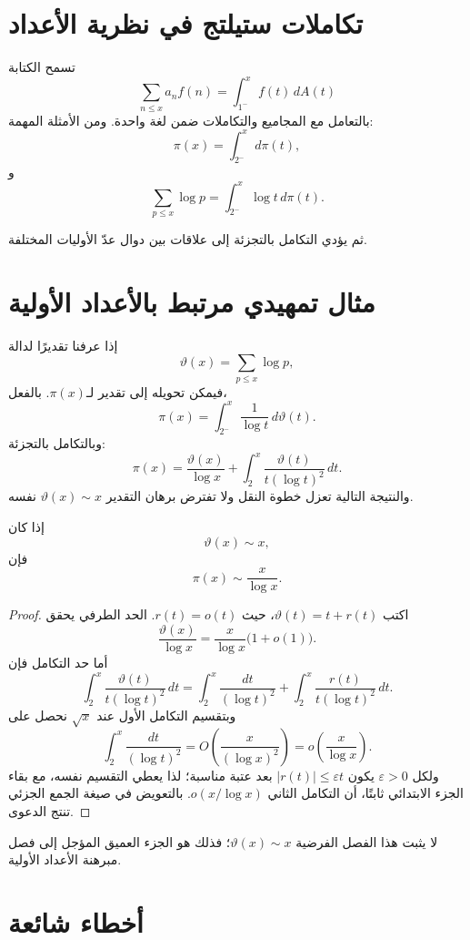 \section{تكاملات ستيلتج في نظرية الأعداد}

تسمح الكتابة
\[
\sum_{n\leq x}a_nf(n)
=
\int_{1^-}^{x}f(t)\,dA(t)
\]
بالتعامل مع المجاميع والتكاملات ضمن لغة واحدة. ومن الأمثلة المهمة:
\[
\pi(x)=\int_{2^-}^{x}d\pi(t),
\]
و
\[
\sum_{p\leq x}\log p
=
\int_{2^-}^{x}\log t\,d\pi(t).
\]

ثم يؤدي التكامل بالتجزئة إلى علاقات بين دوال عدّ الأوليات المختلفة.

\section{مثال تمهيدي مرتبط بالأعداد الأولية}

إذا عرفنا تقديرًا لدالة
\[
\vartheta(x)=\sum_{p\leq x}\log p,
\]
فيمكن تحويله إلى تقدير لـ\(\pi(x)\). بالفعل،
\[
\pi(x)
=
\int_{2^-}^{x}\frac{1}{\log t}\,d\vartheta(t).
\]
وبالتكامل بالتجزئة:
\[
\pi(x)
=
\frac{\vartheta(x)}{\log x}
+
\int_2^x\frac{\vartheta(t)}{t(\log t)^2}\,dt.
\]
والنتيجة التالية تعزل خطوة النقل ولا تفترض برهان التقدير
\(\vartheta(x)\sim x\) نفسه.

\begin{theorem}
\label{thm:theta-implies-pnt}
\provedhere
إذا كان
\[
\vartheta(x)\sim x,
\]
فإن
\[
\pi(x)\sim\frac{x}{\log x}.
\]
\end{theorem}

\begin{proof}
اكتب \(\vartheta(t)=t+r(t)\)، حيث \(r(t)=o(t)\). الحد الطرفي يحقق
\[
\frac{\vartheta(x)}{\log x}
=
\frac{x}{\log x}\bigl(1+o(1)\bigr).
\]
أما حد التكامل فإن
\[
\int_2^x\frac{\vartheta(t)}{t(\log t)^2}\,dt
=
\int_2^x\frac{dt}{(\log t)^2}
+
\int_2^x\frac{r(t)}{t(\log t)^2}\,dt.
\]
وبتقسيم التكامل الأول عند \(\sqrt{x}\) نحصل على
\[
\int_2^x\frac{dt}{(\log t)^2}
=O\!\left(\frac{x}{(\log x)^2}\right)
=o\!\left(\frac{x}{\log x}\right).
\]
ولكل \(\varepsilon>0\) يكون \(|r(t)|\leq\varepsilon t\) بعد عتبة
مناسبة؛ لذا يعطي التقسيم نفسه، مع بقاء الجزء الابتدائي ثابتًا، أن التكامل
الثاني \(o(x/\log x)\). بالتعويض في صيغة الجمع الجزئي تنتج الدعوى.
\end{proof}

لا يثبت هذا الفصل الفرضية \(\vartheta(x)\sim x\)؛ فذلك هو الجزء
العميق المؤجل إلى فصل مبرهنة الأعداد الأولية.

\section{أخطاء شائعة}


